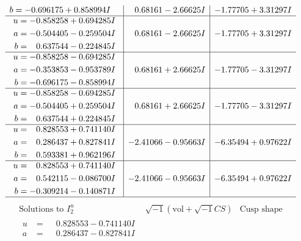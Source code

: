 \documentclass[1p]{elsarticle_modified}
\theoremstyle{definition}
\newcommand{\I}{\sqrt{-1}}
\begin{document}
$$\begin{array}{c|c|c}
\begin{aligned}
b &= -0.696175 + 0.858994 I\end{aligned}
 & \phantom{-}0.68161 - 2.66625 I & -1.77705 + 3.31297 I \\ \hline\begin{aligned}
u &= -0.858258 + 0.694285 I \\
a &= -0.504405 - 0.259504 I \\
b &= \phantom{-}0.637544 - 0.224845 I\end{aligned}
 & \phantom{-}0.68161 - 2.66625 I & -1.77705 + 3.31297 I \\ \hline\begin{aligned}
u &= -0.858258 - 0.694285 I \\
a &= -0.353853 - 0.953789 I \\
b &= -0.696175 - 0.858994 I\end{aligned}
 & \phantom{-}0.68161 + 2.66625 I & -1.77705 - 3.31297 I \\ \hline\begin{aligned}
u &= -0.858258 - 0.694285 I \\
a &= -0.504405 + 0.259504 I \\
b &= \phantom{-}0.637544 + 0.224845 I\end{aligned}
 & \phantom{-}0.68161 + 2.66625 I & -1.77705 - 3.31297 I \\ \hline\begin{aligned}
u &= \phantom{-}0.828553 + 0.741140 I \\
a &= \phantom{-}0.286437 + 0.827841 I \\
b &= \phantom{-}0.593381 + 0.962196 I\end{aligned}
 & -2.41066 - 0.95663 I & -6.35494 + 0.97622 I \\ \hline\begin{aligned}
u &= \phantom{-}0.828553 + 0.741140 I \\
a &= \phantom{-}0.542115 - 0.086700 I \\
b &= -0.309214 - 0.140871 I\end{aligned}
 & -2.41066 - 0.95663 I & -6.35494 + 0.97622 I\\
 \hline 
 \end{array}$$\newpage$$\begin{array}{c|c|c}  
\text{Solutions to }I^u_{2}& \I (\text{vol} + \sqrt{-1}CS) & \text{Cusp shape}\\
 \hline 
\begin{aligned}
u &= \phantom{-}0.828553 - 0.741140 I \\
a &= \phantom{-}0.286437 - 0.827841 I \\

\end{aligned}
\end{array}$$
\end{document}
